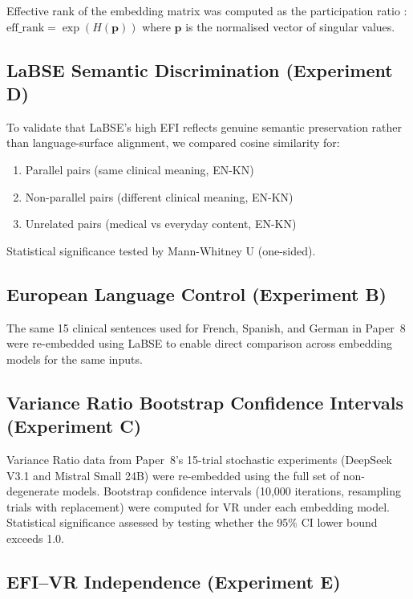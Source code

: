\documentclass[11pt,a4paper]{article}
\begin{document}
Effective rank of the embedding matrix was computed as the participation ratio
\citep{roy2007}: $\text{eff\_rank} = \exp(H(\mathbf{p}))$ where $\mathbf{p}$ is the
normalised vector of singular values.

\subsection{LaBSE Semantic Discrimination (Experiment D)}

To validate that LaBSE's high EFI reflects genuine semantic preservation rather than
language-surface alignment, we compared cosine similarity for:
\begin{enumerate}
    \item Parallel pairs (same clinical meaning, EN-KN)
    \item Non-parallel pairs (different clinical meaning, EN-KN)
    \item Unrelated pairs (medical vs everyday content, EN-KN)
\end{enumerate}

Statistical significance tested by Mann-Whitney U (one-sided).

\subsection{European Language Control (Experiment B)}

The same 15 clinical sentences used for French, Spanish, and German in Paper~8 were
re-embedded using LaBSE to enable direct comparison across embedding models for the
same inputs.

\subsection{Variance Ratio Bootstrap Confidence Intervals (Experiment C)}

Variance Ratio data from Paper~8's 15-trial stochastic experiments (DeepSeek V3.1 and
Mistral Small 24B) were re-embedded using the full set of non-degenerate models.
Bootstrap confidence intervals (10,000 iterations, resampling trials with replacement)
were computed for VR under each embedding model. Statistical significance assessed by
testing whether the 95\% CI lower bound exceeds 1.0.

\subsection{EFI--VR Independence (Experiment E)}
\end{document}
